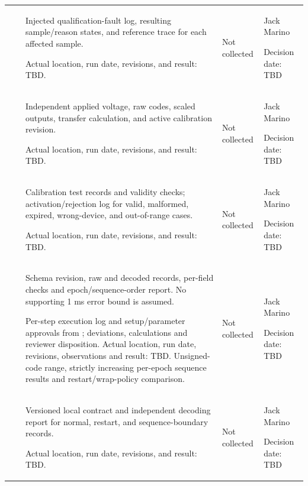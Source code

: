 \begin{landscape}
\begin{tabularx}{\linewidth}{L{2.0cm}L{3.3cm}Y L{2.3cm}L{2.6cm}}
 & \par {} & Injected qualification-fault log, resulting sample/reason states, and reference trace for each affected sample.\par Actual location, run date, revisions, and result: TBD. & Not collected & Jack Marino\par Decision date: TBD\\
 & \par {} & Independent applied voltage, raw codes, scaled outputs, transfer calculation, and active calibration revision.\par Actual location, run date, revisions, and result: TBD. & Not collected & Jack Marino\par Decision date: TBD\\
 & \par {} & Calibration test records and validity checks; activation/rejection log for valid, malformed, expired, wrong-device, and out-of-range cases.\par Actual location, run date, revisions, and result: TBD. & Not collected & Jack Marino\par Decision date: TBD\\
 & \par {} & Schema revision, raw and decoded records, per-field checks and epoch/sequence-order report. No supporting 1 ms error bound is assumed.\par Per-step execution log and setup/parameter approvals from ; deviations, calculations and reviewer disposition. Actual location, run date, revisions, observations and result: TBD. Unsigned-code range, strictly increasing per-epoch sequence results and restart/wrap-policy comparison. & Not collected & Jack Marino\par Decision date: TBD\\
 & \par {} & Versioned local contract and independent decoding report for normal, restart, and sequence-boundary records.\par Actual location, run date, revisions, and result: TBD. & Not collected & Jack Marino\par Decision date: TBD\\

\end{tabularx}
\end{landscape}
